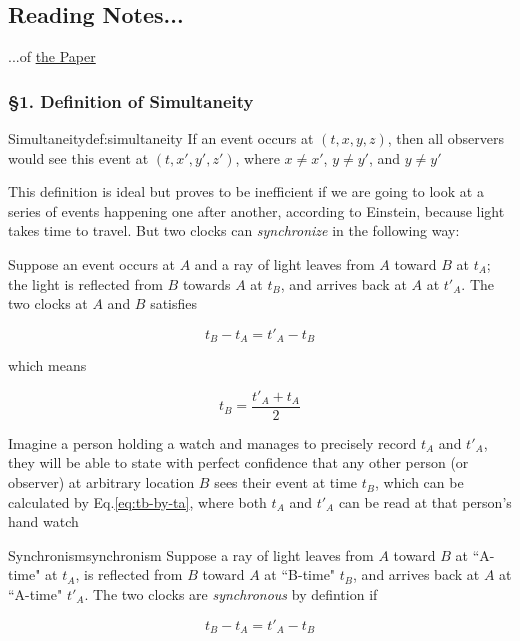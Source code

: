 \subsection{Reading Notes...}

...of \hyperlink{sr-original-paper}{the Paper}

\subsubsection{\hfil \S1. Definition of Simultaneity \hfil}

\begin{Definition}{Simultaneity}{def:simultaneity}
    If an event occurs at $(t, x, y, z)$, then all observers would see this event at $(t, x', y', z')$, where
    $x \ne x'$, $y \ne y'$, and $y \ne y'$
\end{Definition}

This definition is ideal but proves to be inefficient if we are going to look at a series of events happening one after
another, according to Einstein, because light takes time to travel. But two clocks can \textit{synchronize} in the
following way:

Suppose an event occurs at $A$ and a ray of light leaves from $A$ toward $B$ at $t_A$; the light is reflected from $B$
towards $A$ at $t_B$, and arrives back at $A$ at $t'_A$. The two clocks at $A$ and $B$ satisfies

\[
    t_B - t_A = t'_A - t_B
\]

which means

\begin{equation}\label{eq:tb-by-ta}
    t_B = \frac{t'_A + t_A}{2}
\end{equation}

Imagine a person holding a watch and manages to precisely record $t_A$ and $t'_A$, they will be able to state with
perfect confidence that any other person (or observer) at arbitrary location $B$ sees their event at time $t_B$, which
can be calculated by Eq.\ref{eq:tb-by-ta}, where both $t_A$ and $t'_A$ can be read at that person's hand watch

\begin{Definition}{Synchronism}{synchronism}
    Suppose a ray of light leaves from $A$ toward $B$ at ``A-time" at $t_A$, is reflected from $B$ toward $A$ at
    ``B-time" $t_B$, and arrives back at $A$ at ``A-time" $t'_A$. The two clocks are \textit{synchronous} by defintion
    if

    \begin{equation}\label{eq:synchronism}
        t_B - t_A = t'_A - t_B
    \end{equation}
\end{Definition}

